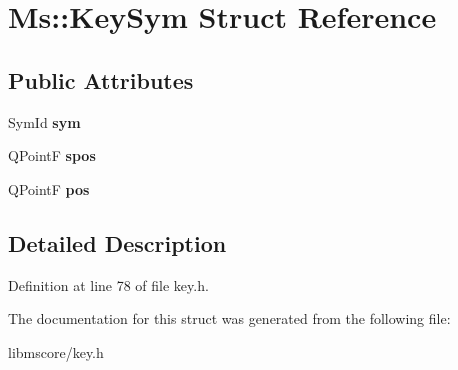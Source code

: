 \hypertarget{struct_ms_1_1_key_sym}{}\section{Ms\+:\+:Key\+Sym Struct Reference}
\label{struct_ms_1_1_key_sym}
\subsection*{Public Attributes}
\begin{DoxyCompactItemize}
\item 
\mbox{\label{struct_ms_1_1_key_sym_a0f7ea5e5e5f1e0d24ece9dd733308af1}} 
Sym\+Id {\bfseries sym}
\item 
\mbox{\label{struct_ms_1_1_key_sym_a405c722e9774d269286cf7699380fe54}} 
Q\+PointF {\bfseries spos}
\item 
\mbox{\label{struct_ms_1_1_key_sym_a181ea4c2f29e86963ad49d486999029c}} 
Q\+PointF {\bfseries pos}
\end{DoxyCompactItemize}


\subsection{Detailed Description}


Definition at line 78 of file key.\+h.



The documentation for this struct was generated from the following file\+:\begin{DoxyCompactItemize}
\item 
libmscore/key.\+h\end{DoxyCompactItemize}
